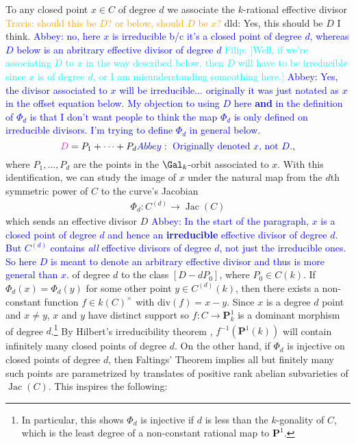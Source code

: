 \documentclass[11pt,reqno]{amsart}
\theoremstyle{plain}
\theoremstyle{definition}
\newcommand{\Jac}{\operatorname{Jac}}
\newcommand{\filip}[1]{{\textcolor{cyan}{Filip: [#1]}}}
\newcommand{\abbey}[1]{\textcolor{blue}{Abbey: #1}}
\newcommand{\dld}[1]{\textcolor{VioletRed}{dld: #1}}
\newcommand{\travis}[1]{\textcolor{orange}{Travis: #1}}
\newcommand{\dldedit}[1]{{\color{VioletRed} #1}}
\newcommand{\abedit}[1]{{\color{blue} #1}}
\begin{document}
To any closed point $x \in C$ of degree $d$ we associate the $k$-rational effective divisor
\travis{should this be $D$? or below, should $D$ be $x$?} \dld{Yes, this should be $D$ I think.} \abbey{no, here $x$ is irreducible b/c it's a closed point of degree $d$, whereas $D$ below is an abritrary effective divisor of degree $d$} \filip{Well, if we're associating $D$ to $x$ in the way described below, then $D$ will have to be irreducible since $x$ is of degree $d$, or I am misunderstanding someothing here.} \abbey{Yes, the divisor associated to $x$ will be irreducible... originally it was just notated as $x$ in the offset equation below. My objection to using $D$ here \textbf{and} in the definition of $\Phi_d$ is that I don't want people to think the map $\Phi_d$ is only defined on irreducible divisors. I'm trying to define $\Phi_d$ in general below.}
\[
 \dldedit{D}=P_1+ \cdots +P_{d} \abbey{\text{ Originally denoted $x$, not $D$.}}, 
\] 
where $P_1, \dots, P_{d}$ are the points in the $\Gal_{k}$-orbit associated to $x$. With this identification, we can study the image of $x$ under the natural map from the $d$th symmetric power of $C$ to the curve's Jacobian
\begin{align}
\label{eqn:phid}
\Phi_d: C^{(d)} \rightarrow \Jac(C)
\end{align}
which sends \abedit{an} effective divisor $D$  \abbey{In the start of the paragraph, $x$ is a closed point of degree $d$ and hence an \textbf{irreducible} effective divisor of degree $d$. But $C^{(d)}$ contains \emph{all} effective divisors of degree $d$, not just the irreducible ones. So here $D$ is meant to denote an arbitrary effective divisor and thus is more general than $x$.} of degree $d$ to the class $[D - dP_0]$, where $P_0 \in C(k)$. If $\Phi_d(x)=\Phi_d(y)$ for some other point $y \in C^{(d)}(k)$, then there exists a non-constant function $f \in k(C)^{\times}$ with $\text{div}(f)=x-y$. Since $x$ is a degree $d$ point and $x\not=y$, $x$ and $y$ have distinct support so $f: C \rightarrow \mathbf{P}^1_{k}$ is a dominant morphism of degree $d$.\footnote{In particular, this shows $\Phi_d$ is injective if $d$ is less than the $k$-gonality of $C$, which is the least degree of a non-constant rational map to $\mathbf{P}^1$.} By Hilbert's irreducibility theorem \cite[Chapter 9]{serre97}, $f^{-1}(\mathbf{P}^{1}(k))$ will contain infinitely many closed points of degree $d$. On the other hand, if $\Phi_d$ is injective on closed points of degree $d$, \abedit{then Faltings' Theorem \cite{faltings} implies all but finitely many such points are parametrized by translates of positive rank abelian subvarieties of $\Jac(C)$.} This inspires the following:
\end{document}
